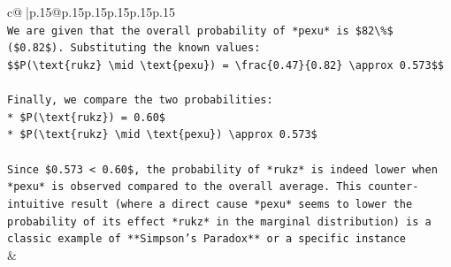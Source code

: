 \documentclass{article}
\begin{document}
{\begin{supertabular}{c@{$\;$}|p{.15\linewidth}@{}p{.15\linewidth}p{.15\linewidth}p{.15\linewidth}p{.15\linewidth}p{.15\linewidth}}
{{{\\ 
\texttt{We are given that the overall probability of *pexu* is \$82\textbackslash{}\%\$ (\$0.82\$). Substituting the known values:} \\
\texttt{\$\$P(\textbackslash{}text\{rukz\} \textbackslash{}mid \textbackslash{}text\{pexu\}) = \textbackslash{}frac\{0.47\}\{0.82\} \textbackslash{}approx 0.573\$\$} \\
\\ 
\texttt{Finally, we compare the two probabilities:} \\
\texttt{*   \$P(\textbackslash{}text\{rukz\}) = 0.60\$} \\
\texttt{*   \$P(\textbackslash{}text\{rukz\} \textbackslash{}mid \textbackslash{}text\{pexu\}) \textbackslash{}approx 0.573\$} \\
\\ 
\texttt{Since \$0.573 < 0.60\$, the probability of *rukz* is indeed lower when *pexu* is observed compared to the overall average. This counter{-}intuitive result (where a direct cause *pexu* seems to lower the probability of its effect *rukz* in the marginal distribution) is a classic example of **Simpson's Paradox** or a specific instance} \\
            }
        }
    }
    & \\ \\


\end{supertabular}}
\end{document}
